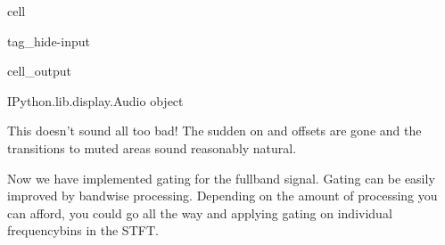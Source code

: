 \documentclass[letterpaper,10pt,english]{jupyterBook}
\begin{document}
\begin{sphinxuseclass}{cell}
\begin{sphinxuseclass}{tag_hide-input}\begin{sphinxVerbatimOutput}

\begin{sphinxuseclass}{cell_output}
\noindent{}

\begin{sphinxVerbatim}[commandchars=\\\{\}]
\PYGZlt{}IPython.lib.display.Audio object\PYGZgt{}
\end{sphinxVerbatim}

\end{sphinxuseclass}\end{sphinxVerbatimOutput}

\end{sphinxuseclass}
\end{sphinxuseclass}
\sphinxAtStartPar
This doesn’t sound all too bad! The sudden on\sphinxhyphen{} and off\sphinxhyphen{}sets are gone and the transitions to muted areas sound reasonably natural.

\sphinxAtStartPar
Now we have implemented gating for the full\sphinxhyphen{}band signal. Gating can be easily improved by band\sphinxhyphen{}wise \sphinxhyphen{}processing. Depending on the amount of processing you can afford, you could go all the way and applying gating on individual frequency\sphinxhyphen{}bins in the STFT.
\end{document}
